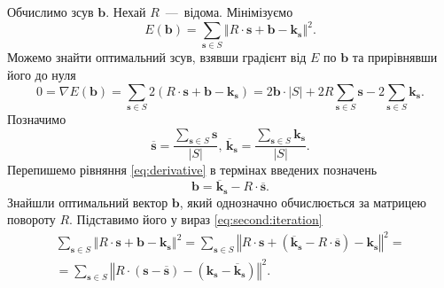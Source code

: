 Обчислимо зсув $ \boldsymbol{b}$.
Нехай $R$~---~відома.
Мінімізуємо
\begin{equation*}
  E \left( \boldsymbol{b} \right) =
  \sum \limits_{\boldsymbol{s} \in S}
    \left \Vert R \cdot \boldsymbol{s} + \boldsymbol{b} - \boldsymbol{k_s} \right \Vert^2.
\end{equation*}
Можемо знайти оптимальний зсув,
взявши градієнт від $E$ по $ \boldsymbol{b}$ та прирівнявши його до нуля
\begin{equation}\label{eq:derivative}
  0 =
  \nabla E \left( \boldsymbol{b} \right) =
  \sum \limits_{\boldsymbol{s} \in S}
    2 \left( R \cdot \boldsymbol{s} + \boldsymbol{b} - \boldsymbol{k_s} \right) =
  2 \boldsymbol{b} \cdot \left| S \right| +
  2 R \sum \limits_{\boldsymbol{s} \in S} \boldsymbol{s} -
  2 \sum \limits_{\boldsymbol{s} \in S} \boldsymbol{k_s}.
\end{equation}
Позначимо
\begin{equation*}
  \overline{\boldsymbol{s}} =
  \frac{ \sum \limits_{\boldsymbol{s} \in S} \boldsymbol{s}}{ \left| S \right| }, \,
  \overline{\boldsymbol{k}}_{\boldsymbol{s}} =
  \frac{ \sum \limits_{\boldsymbol{s} \in S} \boldsymbol{k_s}}{ \left| S \right| }.
\end{equation*}
Перепишемо рівняння \eqref{eq:derivative} в термінах введених позначень
\begin{equation}\label{eq:translation}
  \boldsymbol{b} =
  \overline{\boldsymbol{k}}_{\boldsymbol{s}} - R \cdot \overline{\boldsymbol{s}}.
\end{equation}
Знайшли оптимальний вектор $ \boldsymbol{b}$,
який однозначно обчислюється за матрицею повороту $R$.
Підставимо його у вираз \eqref{eq:second:iteration}
\begin{equation*}
  \begin{gathered}
    \sum \limits_{\boldsymbol{s} \in S}
      \left \Vert R \cdot \boldsymbol{s} + \boldsymbol{b} - \boldsymbol{k_s} \right \Vert^2 =
    \sum \limits_{\boldsymbol{s} \in S}
      \left \Vert
        R \cdot \boldsymbol{s} + \left(
          \overline{\boldsymbol{k}}_{\boldsymbol{s}} - R \cdot \overline{\boldsymbol{s}}
        \right) - \boldsymbol{k_s}
      \right \Vert^2 = \\
    = \sum \limits_{\boldsymbol{s} \in S}
      \left \Vert
        R \cdot \left( \boldsymbol{s} - \overline{\boldsymbol{s}} \right) -
        \left( \boldsymbol{k_s} - \overline{\boldsymbol{k}}_{\boldsymbol{s}} \right)
      \right \Vert^2.
  \end{gathered}
\end{equation*}
